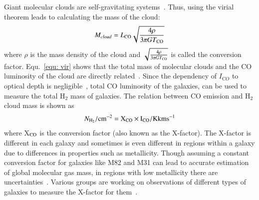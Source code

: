 Giant molecular clouds are self-gravitating systems~\citep[e.g.][]{Efstathiou83,Blitz99}.
Thus, using the virial theorem leads to calculating the mass of the cloud: 
 \begin{equation}
 \label{equ: vir}
 M_{cloud} = L_{\rm CO} \sqrt{\frac{4\rho}{3\pi G T_{\rm CO}}}
 \end{equation}
 where $\rho$ is the mass density of the cloud and $\sqrt{\frac{4\rho}{3\pi G T_{\rm CO}}}$ is called the conversion factor.
 Equ.~\ref{equ: vir} shows that the total mass of molecular clouds and the CO luminosity of the cloud are directly related~\citep{Young91}. 
 Since the dependency of $I_{\mathrm CO}$ to optical depth is negligible~\citep{Krumholz09}, total CO luminosity of the galaxies, can be used to measure the total H$_2$ mass of galaxies.
 The relation between CO emission and H$_2$ cloud mass is shown as
\begin{equation}
N_{\rm H_2}/\rm cm^{-2} = X_{\rm CO} \times I_{\rm CO}/{\rm K km s}^{-1}
\end{equation}
where X$_{\rm CO}$ is the conversion factor (also known as the X-factor).
The X-factor is different in each galaxy and sometimes is even different in regions within a galaxy due to differences in properties such as metallicity. 
Though assuming a constant conversion factor for galaxies like M82 and M31 can lead to accurate estimation of global molecular gas mass, in regions with low metallicity there are uncertainties~\citep{Bolato13}. 
Various groups are working on observations of different types of galaxies to measure the X-factor for them~\citep{Wilson95, Bosselli02, Bolato13}.

